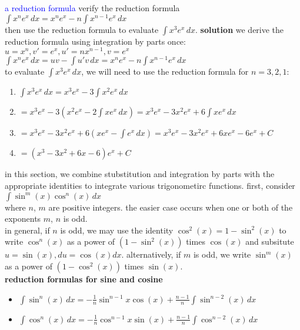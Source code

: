 \documentclass{article}
\begin{document}
\textcolor{blue}{a reduction formula} verify the reduction formula\\
$\int x^ne^x\,dx = x^ne^x - n \int x^{n-1}e^x\,dx$\\
then use the reduction formula to evaluate $\int x^3e^x\,dx$.
\textbf{solution} we derive the reduction formula using integration by parts once:\\
$u = x^n, v'=e^x, u' = nx^{n-1}, v = e^x$\\
$\int x^ne^x\,dx = uv - \int u'v\,dx = x^ne^x - n\int x^{n-1}e^x\,dx$\\
to evaluate $\int x^3e^x\,dx$, we will need to use the reduction formula for $n = 3, 2, 1$:\\
	\begin{enumerate}
		\item $\int x^3e^x\,dx = x^3e^x - 3\int x^2e^x\,dx$
		\item $= x^3e^x - 3(x^2e^x - 2\int xe^x\,dx) = x^3e^x - 3x^2e^x + 6 \int xe^x\,dx$
		\item $= x^3e^x - 3x^2e^x + 6(xe^x - \int e^x\,dx) = x^3e^x - 3x^2e^x + 6xe^x - 6e^x + C$
		\item $= (x^3 - 3x^2 + 6x - 6)e^x + C$
	\end{enumerate}

in this section, we combine stubstitution and integration by parts with the appropriate identities to integrate various trigonometirc functions. first, consider\\ $\int \sin^m(x)\cos^n(x)\,dx$\\ where $n$, $m$ are positive integers. the easier case occurs when one or both of the exponents $m$, $n$ is odd.\\

in general, if $n$ is odd, we may use the identity $\cos^2(x) = 1 - \sin^2(x)$ to write $\cos^n(x)$ as a power of $(1 - \sin^2(x))$ times $\cos(x)$ and subsitute $u = \sin(x), du = \cos(x)dx$. alternatively, if $m$ is odd, we write $\sin^m(x)$ as a power of $(1 - \cos^2(x))$ times $\sin(x)$.\\

\textbf{reduction formulas for sine and cosine}
	\begin{itemize}
		\item $\int\sin^n(x)\,dx = -\frac{1}{n}\sin^{n-1}x\cos(x) + \frac{n-1}{n}\int\sin^{n-2}(x)\,dx$
		\item $\int\cos^n(x)\,dx = -\frac{1}{n}\cos^{n-1}x\sin(x) + \frac{n-1}{n}\int\cos^{n-2}(x)\,dx$ 
	\end{itemize}
\end{document}
